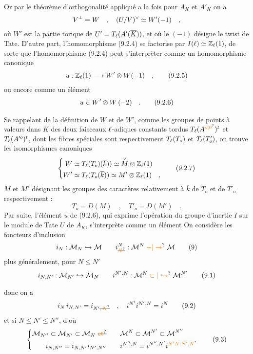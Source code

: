 Or par le théorème d'orthogonalité appliqué a la fois pour $A_K$ et $A'_K$ on a
\[
V^{\perp}=W\quad ,\quad (U/V)^{\vee}\simeq W'(-1)\quad ,
\]
où $W'$ est la partie torique de $U'=T_{\ell}(A'(\overline K))$, et où le $(-1)$ désigne le twist de Tate. D'autre part, l'homomorphisme (9.2.4) se factorise par $I(\ell)\simeq\mathbb Z_{\ell}(1)$, de sorte que l'homomorphisme (9.2.4) peut s'interprèter comme un homomorphisme canonique
\[
u:\mathbb Z_{\ell}(1)\longrightarrow W'\otimes W(-1)\quad ,\tag*{(9.2.5)}
\]
ou encore comme un élément
\[
u\in W'\otimes W\,(-2)\quad .\tag*{(9.2.6)}
\]

Se rappelant de la définition de $W$ et de $W'$, comme les groupes de points à valeurs dans $\overline K$ des deux faisceaux $\ell$-adiques constants tordus $T_{\handwritten{\ell}}(A^{\unsure{o|0}})^{t}$ et $T_{\ell}(A'^{o})^{t}$, dont les fibres spéciales sont respectivement $T_{\ell}(T_o)$ et $T_{\ell}(T'_o)$, on trouve les isomorphismes canoniques
\[
\left\{\begin{aligned}
W&\simeq T_{\ell}(T_o)(\overline k))\simeq\overset{\scriptscriptstyle\vee}{M}\otimes\mathbb Z_{\ell}(1)\\
W'&\simeq T_{\ell}(T_o(\overline k))\simeq M'\otimes\mathbb Z_{\ell}(1)\quad ,
\end{aligned}\right.\tag*{(9.2.7)}
\]
$M$ et $M'$ désignant les groupes des caractères relativement à $\overline k$ de $T_o$ et de $T'_o$ respectivement :
\[
T_o=D(M)\quad ,\quad T'_o=D(M')\quad .\tag*{(9.2.8)}
\]
Par suite, l'élément $u$ de (9.2.6), qui exprime l'opération du groupe d'inertie $I$ sur le module de Tate $U$ de $A_K$, s'interprète comme un élément
On considère les foncteurs d'inclusion
\[
i_N:\mathcal M_N\hookrightarrow\mathcal M\qquad i_{\deleted{\unsure{N}}}^{N}:\mathcal M^{N}\mathrel{\unsure{-|\to}}\mathcal M\tag*{(9)}
\]
plus généralement, pour $N\leq N'$
\[
i_{N,N'}:\mathcal M_{N'}\hookrightarrow\mathcal M_N\qquad i^{N',N}:\mathcal M^{N}\mathrel{\unsure{\subset|\hookrightarrow}}\mathcal M^{N'}\tag*{(9.1)}
\]


donc on a
\[
i_N\,i_{N,N'}=i_{N'\deleted{\unsure{,N}}}\quad,\quad i^{N'}i^{N',N}=i^{N}\tag*{(9.2)}
\]
 et si $N\leq N'\leq N''$, d'où 
\[
\left\{\begin{aligned}
\mathcal M_{N''}\subset\mathcal M_{N'}\subset\mathcal M_N\ \deleted{\text{\unsure{et}}}&\qquad\mathcal M^{N}\subset\mathcal M^{N'}\subset\mathcal M^{N''}\\
i_{N,N''}=i_{N,N'}i_{N',N''}&\qquad i^{N'',N}=i^{N'',N'}i^{\unsure{N'N|N',N}}
\end{aligned}\right.\tag*{(9.3)}
\]

